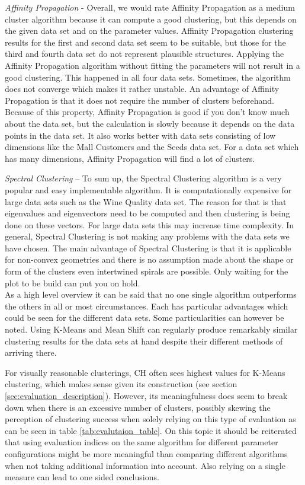 \textit{Affinity Propagation} - Overall, we would rate Affinity Propagation as a medium cluster algorithm because it can compute a good clustering, but this depends on the given data set and on the parameter values. Affinity Propagation clustering results for the first and second data set seem to be suitable, but those for the third and fourth data set do not represent plausible structures. Applying the Affinity Propagation algorithm without fitting the parameters will not result in a good clustering. This happened in all four data sets. Sometimes, the algorithm does not converge which makes it rather unstable. An advantage of Affinity Propagation is that it does not require the number of clusters beforehand. Because of this property, Affinity Propagation is good if you don’t know much about the data set, but the calculation is slowly because it depends on the data points in the data set. It also works better with data sets consisting of low dimensions like the Mall Customers and the Seeds data set. For a data set which has many dimensions, Affinity Propagation will find a lot of clusters.

\textit{Spectral Clustering} – To sum up, the Spectral Clustering algorithm is a very popular and easy implementable algorithm. It is computationally expensive for large data sets such as the Wine Quality data set. The reason for that is that eigenvalues and eigenvectors need to be computed and then clustering is being done on these vectors. For large data sets this may increase
time complexity. \newline
In general, Spectral Clustering is not making any problems with the data sets we have chosen. The main advantage of Spectral Clustering is that it is applicable for non-convex geometries and there is no assumption made about the shape or form of the clusters even intertwined spirals are possible. Only waiting for the plot to be build can put you on hold.\\

As a high level overview it can be said that no one single algorithm outperforms the others in all or most circumstances. Each has particular advantages which could be seen for the different data sets. Some particularities can however be noted. Using K-Means and Mean Shift can regularly produce remarkably similar clustering results for the data sets at hand despite their different methods of arriving there. 

For visually reasonable clusterings, \gls{CH} often sees highest values for K-Means clustering, which makes sense given its construction (see section \ref{sec:evaluation_description}). However, its meaningfulness does seem to break down when there is an excessive number of clusters, possibly skewing the perception of clustering success when solely relying on this type of evaluation as can be seen in table \ref{tab:evalutaion_table}. On this topic it should be reiterated that using evaluation indices on the same algorithm for different parameter configurations might be more meaningful than comparing different algorithms when not taking additional information into account. Also relying on a single measure can lead to one sided conclusions.


